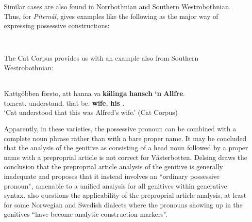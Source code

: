 \ea
{}
\z 
\z

Similar cases are also found in Norrbothnian and Southern Westrobothnian. Thus, for \textit{Pitemål}, \citet{Brännström1993} gives examples like the following as the major way of expressing possessive constructions:

\ea%
\\

\z 
\z

The Cat Corpus provides us with an example also from Southern Westrobothnian:


\ea%
\\
\gll Kattgöbben  försto, att  hanna  va  \textbf{kälinga} \textbf{hansch} \textbf{‘n} \textbf{Allfre}.\\
tomcat.{}  understand.{\pst} that  {\dem}  be.{\pst}  \textbf{wife.{}} \textbf{his} \textbf{{\pda}.{\m}} \\ 
\glt ‘Cat understood that this was Alfred’s wife.’ (Cat Corpus)
\z

Apparently, in these varieties, the possessive pronoun can be combined with a complete noun phrase rather than with a bare proper name. It may be concluded that the analysis of the genitive as consisting of a head noun followed by a proper name with a preproprial article is not correct for Västerbotten.  Delsing draws the conclusion that the preproprial article analysis of the genitive is generally inadequate and proposes that it instead involves an “ordinary possessive pronoun”, amenable to a unified analysis for all genitives within generative syntax. \citet{KoptjevskajaTamm2003} also questions the applicability of the preproprial article analysis, at least for some Norwegian and Swedish dialects where the pronouns showing up in the genitives “have become analytic construction markers”. 

